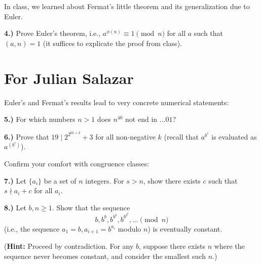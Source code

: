 \documentclass[10pt]{amsart}
\begin{document}
\medskip

\noindent In class, we learned about Fermat's little theorem and its generalization due to Euler.

\medskip

{\bf 4.)} Prove Euler's theorem, i.e., $a^{\phi(n)} \equiv 1 \pmod n$ for all $a$ such that $(a,n) = 1$ (it suffices to explicate the proof from class).

\section*{For Julian Salazar}

\noindent Euler's and Fermat's results lead to very concrete numerical statements:

\medskip

{\bf 5.)} For which numbers $n > 1$ does $n^{40}$ not end in $...01$?

\medskip

{\bf 6.)} Prove that $19 \mid 2^{2^{6k+2}} + 3$ for all non-negative $k$ (recall that $a^{b^c}$ is evaluated as $a^{(b^c)}$).

\medskip
 
\noindent Confirm your comfort with congruence classes:

\medskip

{\bf 7.)} Let $\{a_i\}$ be a set of $n$ integers. For $s > n$, show there exists $c$ such that $s \nmid a_i + c$ for all $a_i$.

\medskip

{\bf 8.)} Let $b, n \ge 1$. Show that the sequence
\[
b, b^b, b^{b^b}, b^{b^{b^b}}, \dotsc \pmod{n}
\]
(i.e., the sequence $a_1 = b, a_{i+1} = b^{a_{i}}$ modulo $n$) is eventually constant.

\smallskip

({\bf Hint:} Proceed by contradiction. For any $b$, suppose there exists $n$ where the sequence never becomes constant, and consider the smallest such $n$.)
\end{document}
